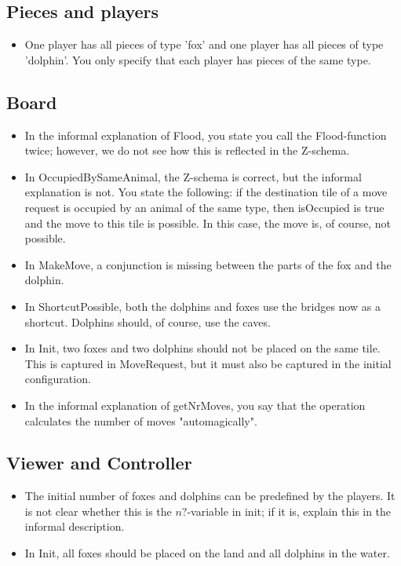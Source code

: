 \documentclass[a4paper,11pt]{article}
\begin{document}
    \subsection{Pieces and players}
    \begin{itemize}
        \item One player has all pieces of type 'fox' and one player has all pieces of type 'dolphin'. You only specify that each player has pieces of the same type.
    \end{itemize}

    \subsection{Board}
    \begin{itemize}
        \item In the informal explanation of Flood, you state you call the Flood-function twice; however, we do not see how this is reflected in the Z-schema.
        \item In OccupiedBySameAnimal, the Z-schema is correct, but the informal explanation is not. You state the following: if the destination tile of a move request is occupied by an animal of the same type, then isOccupied is true and the move to this tile is possible. In this case, the move is, of course, not possible.
        \item In MakeMove, a conjunction is missing between the parts of the fox and the dolphin.
        \item In ShortcutPossible, both the dolphins and foxes use the bridges now as a shortcut. Dolphins should, of course, use the caves.
        \item In Init, two foxes and two dolphins should not be placed on the same tile. This is captured in MoveRequest, but it must also be captured in the initial configuration.
        \item In the informal explanation of getNrMoves, you say that the operation calculates the number of moves "automagically".
    \end{itemize}

    \subsection{Viewer and Controller}
    \begin{itemize}
        \item The initial number of foxes and dolphins can be predefined by the players. It is not clear whether this is the $n?$-variable in init; if it is, explain this in the informal description.
        \item In Init, all foxes should be placed on the land and all dolphins in the water.
    \end{itemize}
\end{document}
